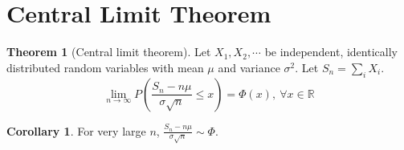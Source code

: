 \documentclass[10pt, a4paper]{extarticle}
\theoremstyle{definition}
\newtheorem{thm}{Theorem}
\newtheorem{cor}{Corollary}[thm]
\begin{document}
\section{Central Limit Theorem}
\begin{thm}[Central limit theorem]
	Let $X_1,X_2,\cdots$ be independent, identically distributed random variables with mean $\mu$ and variance $\sigma^2$. Let $S_n=\sum_iX_i$.
	\[\lim_{n\to\infty}P\left(\frac{S_n-n\mu}{\sigma\sqrt{n}}\leq x\right)=\Phi(x),\ \forall x\in\mathbb{R}\]
\end{thm}

\begin{cor}
	For very large $n$, $\frac{S_n-n\mu}{\sigma\sqrt{n}}\sim\Phi$.
\end{cor}
\end{document}
